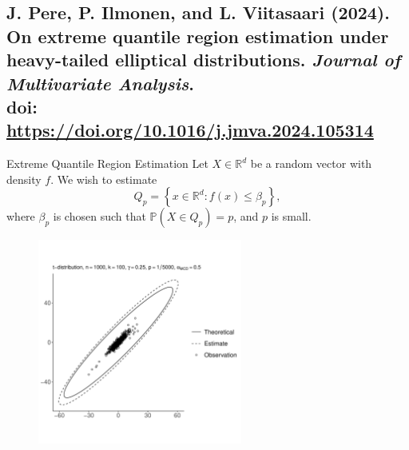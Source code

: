 \documentclass[11pt, aspectratio=169]{beamer}
\begin{document}
\subsection{J. Pere, P. Ilmonen, and L. Viitasaari (2024). On extreme quantile
region estimation under heavy-tailed elliptical distributions. \emph{Journal of
Multivariate Analysis}.\\
doi: \textcolor{hyscience}{\url{https://doi.org/10.1016/j.jmva.2024.105314}}}


\begin{frame}{Extreme Quantile Region Estimation}
  Let $X\in\mathbb{R}^d$ be a random vector with density $f$. We wish to
  estimate
  \begin{equation*}
    Q_p = \left\{x\in\mathbb{R}^d : f(x)\leq \beta_p\right\},
  \end{equation*}
  where $\beta_p$ is chosen such that $\mathbb{P}\left(X\in Q_p\right) = p$, and
  $p$ is small.
\end{frame}


\begin{frame}
  \begin{center}
    \begin{figure}
      \includegraphics[width=0.6\textwidth]{elliptical}
  \end{figure}
\end{center}
\end{frame}

\end{document}
